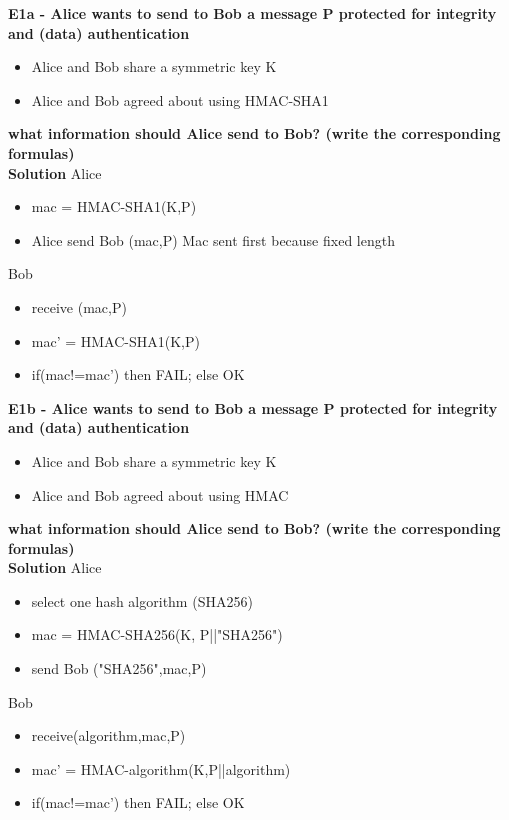\textbf{E1a - Alice wants to send to Bob a message P protected for integrity and (data) authentication}
\begin{itemize}
    \item Alice and Bob share a symmetric key K
    \item Alice and Bob agreed about using HMAC-SHA1
\end{itemize}
\textbf{what information should Alice send to Bob? (write the corresponding formulas)\\}
\textbf{Solution}
Alice
\begin{itemize}
    \item mac = HMAC-SHA1(K,P)
    \item Alice send Bob (mac,P) \textcolor{Comment}{Mac sent first because fixed length}
\end{itemize}
Bob
\begin{itemize}
    \item receive (mac,P)
    \item mac' = HMAC-SHA1(K,P)
    \item if(mac!=mac') then FAIL; else OK
\end{itemize}

\textbf{E1b - Alice wants to send to Bob a message P protected for integrity and (data) authentication}
\begin{itemize}
    \item Alice and Bob share a symmetric key K
    \item Alice and Bob agreed about using HMAC
\end{itemize}
\textbf{what information should Alice send to Bob? (write the corresponding formulas)\\}
\textbf{Solution}
Alice
\begin{itemize}
    \item select one hash algorithm (SHA256)
    \item mac = HMAC-SHA256(K, P||"SHA256")
    \item send Bob ("SHA256",mac,P)
\end{itemize}
Bob
\begin{itemize}
    \item receive(algorithm,mac,P)
    \item mac' = HMAC-algorithm(K,P||algorithm) %
    \item if(mac!=mac') then FAIL; else OK
\end{itemize}



